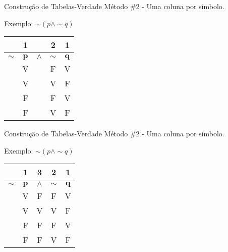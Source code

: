 \begin{frame}[t]{Construção de Tabelas-Verdade} %
	Método \#2 - Uma coluna por símbolo.
	
	\begin{center}
	Exemplo: $\sim (p \wedge \sim q)$
	
	\vskip 0.8cm
		
	\begin{tabular}{|c|c|c|c|c|}
	\hline
	& {\tiny 1} & & {\tiny 2} & {\tiny 1} \\
	\hline
	\hline
	$\mathbf{\sim}$ & $\mathbf{p}$ & $\mathbf{\wedge}$ & $\mathbf{\sim}$ & $\mathbf{q}$ \\
	\hline
	  & V &   & F & V \\
	\hline
	  & V &   & V & F \\
	\hline
	  & F &   & F & V \\
	\hline
	  & F &   & V & F \\
	\hline
	\end{tabular}
	\end{center}
\end{frame}

\begin{frame}[t]{Construção de Tabelas-Verdade} %
	Método \#2 - Uma coluna por símbolo.
	
	\begin{center}
	Exemplo: $\sim (p \wedge \sim q)$
	
	\vskip 0.8cm
		
	\begin{tabular}{|c|c|c|c|c|}
	\hline
	& {\tiny 1} & {\tiny 3} & {\tiny 2} & {\tiny 1} \\
	\hline
	\hline
	$\mathbf{\sim}$ & $\mathbf{p}$ & $\mathbf{\wedge}$ & $\mathbf{\sim}$ & $\mathbf{q}$ \\
	\hline
	  & V & F & F & V \\
	\hline
	  & V & V & V & F \\
	\hline
	  & F & F & F & V \\
	\hline
	  & F & F & V & F \\
	\hline
	\end{tabular}
	\end{center}
\end{frame}

